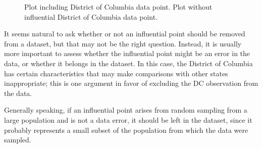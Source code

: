 \begin{figure}[h]
	\centering
	\caption{ Plot including District of Columbia data point.  Plot without influential District of Columbia data point.}
	\label{infMortUS}
\end{figure}	

It seems natural to ask whether or not an influential point should be removed from a dataset, but that may not be the right question. Instead, it is usually more important to assess whether the influential point might be an error in the data, or whether it belongs in the dataset. In this case, the District of Columbia has certain characteristics that may make comparisons with other states inappropriate; this is one argument in favor of excluding the DC observation from the data. 

Generally speaking, if an influential point arises from random sampling from a large population and is not a data error, it should be left in the dataset, since it probably represents a small subset of the population from which the data were sampled. 

